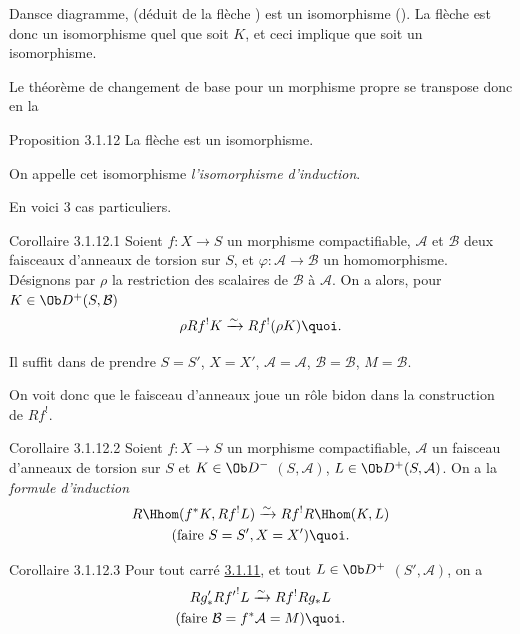 Dans\pageoriginale ce diagramme,  (déduit de la flèche
) est un isomorphisme (). La
flèche  
est donc un isomorphisme quel que soit $K$, et ceci implique que
 soit un isomorphisme.

Le théorème de changement de base pour un morphisme propre se
transpose donc en la 

\begin{enonce*}{Proposition 3.1.12}
La flèche  est un isomorphisme.
\end{enonce*}

On appelle cet isomorphisme \emph{l'isomorphisme d'induction}.

En voici 3 cas particuliers.

\begin{enonce*}{Corollaire 3.1.12.1}
Soient $f:X\rightarrow S$ un morphisme compactifiable, $\mathcal{A}$
et $\mathcal{B}$ deux faisceaux d'anneaux de torsion sur $S$, et
$\varphi:\mathcal{A}\rightarrow \mathcal{B}$ un
homomorphisme. Désignons par $\rho$ la restriction des scalaires de
$\mathcal{B}$ à $\mathcal{A}$. On a alors, pour $K\in \Ob
D^{+}(S,\mathcal{B})$
$$
\rho Rf^{!}K\xrightarrow{\sim} Rf^{!}(\rho K){\quoi}.
$$
\end{enonce*}

Il suffit dans  de prendre $S=S'$, $X=X'$,
$\mathcal{A}=\mathcal{A}$, $\mathcal{B}=\mathcal{B}$, $M=\mathcal{B}$.

On voit donc que le faisceau d'anneaux joue un rôle bidon dans la
construction de $Rf^{!}$.

\begin{enonce*}{Corollaire 3.1.12.2}
Soient $f:X\rightarrow S$ un morphisme compactifiable, $\mathcal{A}$
un faisceau d'anneaux de torsion sur $S$ et $K\in \Ob D^{-}$
$(S,\mathcal{A})$, $L\in \Ob D^{+}(S,\mathcal{A})$. On a la \emph{formule
d'induction}
\begin{gather*}
R\Hhom(f^{\ast}K,Rf^{!}L)\xrightarrow{\sim} Rf^{!}R\Hhom(K,L)\\
(\text{\rm faire } S=S', X=X'){\quoi}.
\end{gather*}
\end{enonce*}

\begin{enonce*}{Corollaire 3.1.12.3}
Pour tout carré \hyperref[XVIII.subsubsec3.1.11]{3.1.11}, et tout $L\in \Ob D^{+}$
$(S',\mathcal{A})$, on a
\begin{gather*}
Rg'_{\ast}R{f'}^{!}L\xrightarrow{\sim} Rf^{!}Rg_{\ast}L\\
(\text{\rm faire } \mathcal{B}=f^{\ast}\mathcal{A}=M){\quoi}. 
\end{gather*}
\end{enonce*}

